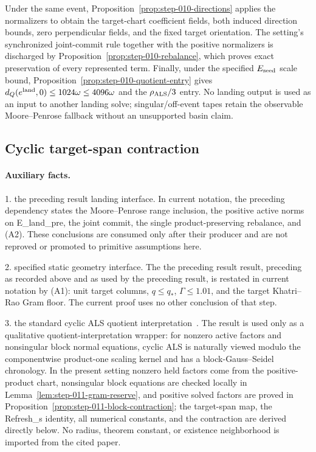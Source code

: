 Under the same event, Proposition~\ref{prop:step-010-directions} applies the
normalizers to obtain the target-chart coefficient fields, both induced
direction bounds, zero perpendicular fields, and the fixed target
orientation.  The setting's synchronized joint-commit rule together with the
positive normalizers is discharged by
Proposition~\ref{prop:step-010-rebalance}, which proves exact preservation of
every represented term.  Finally, under the specified \(E_{\rm seed}\) scale
bound, Proposition~\ref{prop:step-010-quotient-entry} gives
\(d_Q(e^{\rm land},0)\le1024\omega\le4096\omega\) and the
\(\rho_{\rm ALS}/3\) entry.  No landing output is used as an input to another
landing solve; singular/off-event tapes retain the observable
Moore--Penrose fallback without an unsupported basin claim.

\subsection{Cyclic target-span contraction}\label{app:step-011}

\paragraph{Auxiliary facts.}

1. the preceding result landing interface. In current notation, the
   preceding dependency states the Moore--Penrose range inclusion, the
   positive active norms on E\_land\_pre, the joint commit, the single
   product-preserving rebalance, and (A2). These conclusions are consumed
   only after their producer and are not reproved or promoted to primitive
   assumptions here.

2. specified static geometry interface. The the preceding result result,
   preceding as recorded above and as used by the preceding result, is restated
   in current notation by (A1): unit target
   columns, \(q\le q_*\), \(\Gamma\le1.01\), and the target Khatri--Rao
   Gram floor. The current proof uses no other conclusion of that step.

3. the standard cyclic ALS quotient interpretation~\citep{Uschmajew2012}. The result is used only as a
   qualitative quotient-interpretation wrapper: for nonzero active factors
   and nonsingular block normal equations, cyclic ALS is naturally viewed
   modulo the componentwise product-one scaling kernel and has a
   block-Gauss--Seidel chronology. In the present setting nonzero held factors
   come from the positive-product chart, nonsingular block equations are
   checked locally in Lemma~\ref{lem:step-011-gram-reserve}, and positive
   solved factors are proved in Proposition~\ref{prop:step-011-block-contraction};
   the target-span map, the Refresh\_s identity, all numerical constants, and
   the contraction are derived directly below. No radius, theorem constant, or
   existence neighborhood is imported from the cited paper.


